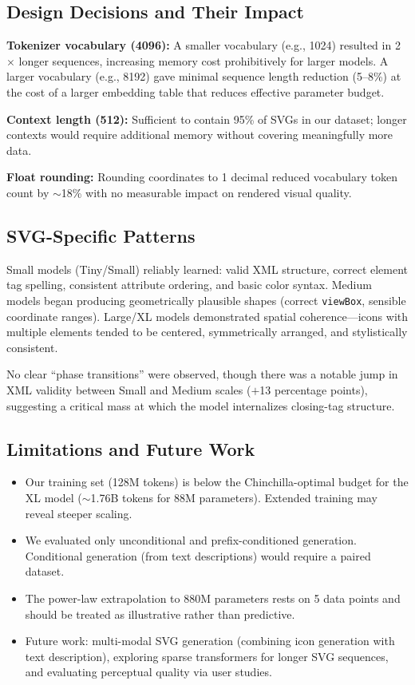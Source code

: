 \documentclass[11pt,letterpaper]{article}
\begin{document}
\subsection{Design Decisions and Their Impact}

\textbf{Tokenizer vocabulary (4096):} A smaller vocabulary (e.g., 1024) resulted in 2$\times$
longer sequences, increasing memory cost prohibitively for larger models. A larger vocabulary
(e.g., 8192) gave minimal sequence length reduction (5--8\%) at the cost of a larger embedding
table that reduces effective parameter budget.

\textbf{Context length (512):} Sufficient to contain 95\% of SVGs in our dataset; longer
contexts would require additional memory without covering meaningfully more data.

\textbf{Float rounding:} Rounding coordinates to 1 decimal reduced vocabulary token count
by $\sim$18\% with no measurable impact on rendered visual quality.

\subsection{SVG-Specific Patterns}

Small models (Tiny/Small) reliably learned: valid XML structure, correct element tag
spelling, consistent attribute ordering, and basic color syntax. Medium models began
producing geometrically plausible shapes (correct \texttt{viewBox}, sensible coordinate
ranges). Large/XL models demonstrated spatial coherence---icons with multiple elements
tended to be centered, symmetrically arranged, and stylistically consistent.

No clear ``phase transitions'' were observed, though there was a notable jump in XML
validity between Small and Medium scales ($+$13 percentage points), suggesting a critical
mass at which the model internalizes closing-tag structure.

\subsection{Limitations and Future Work}

\begin{itemize}[nosep]
  \item Our training set (128M tokens) is below the Chinchilla-optimal budget for the XL
        model ($\sim$1.76B tokens for 88M parameters). Extended training may reveal steeper
        scaling.
  \item We evaluated only unconditional and prefix-conditioned generation. Conditional
        generation (from text descriptions) would require a paired dataset.
  \item The power-law extrapolation to 880M parameters rests on 5 data points and should
        be treated as illustrative rather than predictive.
  \item Future work: multi-modal SVG generation (combining icon generation with text
        description), exploring sparse transformers for longer SVG sequences, and
        evaluating perceptual quality via user studies.
\end{itemize}
\end{document}
